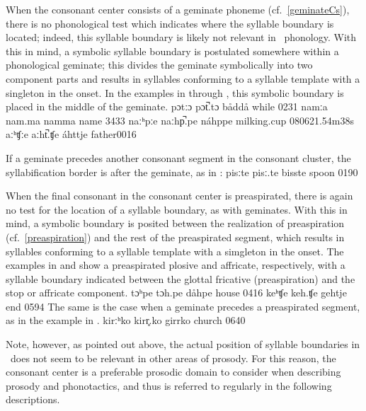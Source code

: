 When the consonant center consists of a geminate phoneme (cf.~\SEC\ref{geminateCs}), there is no phonological test which indicates where the syllable boundary is located; 
indeed, this syllable boundary is likely not relevant in \PS\ phonology. With this in mind, a symbolic syllable boundary is postulated somewhere within a phonological geminate; this divides the geminate symbolically into two component parts and results in syllables conforming to a syllable template with a singleton in the onset. In the examples in  through , this symbolic boundary is placed in the middle of the geminate.
	{pɔtːɔ}	{pɔt̚.tɔ}		{båddå}	{while\BS{}}		{0231}
	{namːa}	{nam.ma}		{namma}	{name\BS{}}		{3433}
	{naːʰpːe}	{naːhp̚.pe}	{náhppe}	{milking.cup\BS{}}	{080621}{.54m38s}
		{aːʰʧːe}	{aːht̚.ʧe}	{áhttje}	{father\BS{}}{0016}

If a geminate precedes another consonant segment in the consonant cluster, the syllabification border is after the geminate, as in :
	{pisːte}	{pisː.te}		{bisste}	{spoon\BS{}}		{0190}

When the final consonant in the consonant center is preaspirated, there is again no test for the location of a syllable boundary, as with geminates. With this in mind, a symbolic boundary is posited between the realization of preaspiration (cf.~\SEC\ref{preaspiration}) and the rest of the preaspirated segment, which results in syllables conforming to a syllable template with a simgleton in the onset. The examples in  and  show a preaspirated plosive and affricate, respectively, with a syllable boundary indicated between the glottal fricative (preaspiration) and the stop or affricate component.
	{tɔʰpe}	{tɔh.pe}		{dåhpe}	{house\BS{}}		{0416}
		{keʰʧe}	{keh.ʧe}		{gehtje}	{end\BS{}}		{0594}
The same is the case when a geminate precedes a preaspirated segment, as in the example in . %
	{kirːʰko}	{kirr̥.ko}		{girrko}	{church\BS{}}		{0640}

Note, however, as pointed out above, the actual position of syllable boundaries in \PS\ does not seem to be relevant in other areas of prosody. 
For this reason, the consonant center is a preferable prosodic domain to consider when describing prosody and phonotactics, and thus is referred to regularly in the following descriptions.



